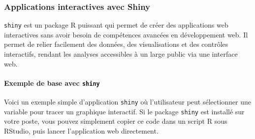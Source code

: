 \documentclass[
  letterpaper,
  DIV=11,
  numbers=noendperiod]{scrreprt}
\let\oldparagraph\paragraph
\renewcommand{\paragraph}[1]{\oldparagraph{#1}\mbox{}}
\begin{document}
\subsubsection{Applications interactives avec
Shiny}\label{applications-interactives-avec-shiny}

\texttt{shiny} est un package R puissant qui permet de créer des
applications web interactives sans avoir besoin de compétences avancées
en développement web. Il permet de relier facilement des données, des
visualisations et des contrôles interactifs, rendant les analyses
accessibles à un large public via une interface web.

\paragraph{\texorpdfstring{Exemple de base avec
\texttt{shiny}}{Exemple de base avec shiny}}\label{exemple-de-base-avec-shiny}

Voici un exemple simple d'application \texttt{shiny} où l'utilisateur
peut sélectionner une variable pour tracer un graphique interactif. Si
le package \texttt{shiny} est installé sur votre poste, vous pouvez
simplement copier ce code dans un script R sous RStudio, puis lancer
l'application web directement.
\end{document}
